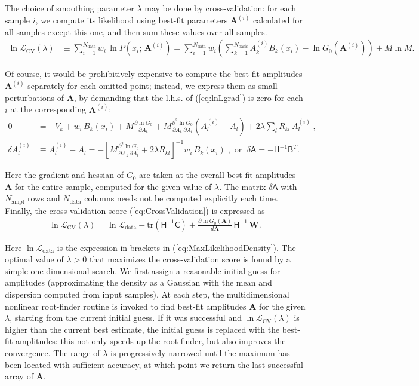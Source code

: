\documentclass[12pt]{article}
\renewcommand{\d}{\partial}
\newcommand{\bA}{\boldsymbol{A}}
\begin{document}
The choice of smoothing parameter $\lambda$ may be done by cross-validation: for each sample $i$, we compute its likelihood using best-fit parameters $\bA^{(i)}$ calculated for all samples except this one, and then sum these values over all samples. 
\begin{align}  \label{eq:CrossValidation}
\ln\mathcal{L}_\mathrm{CV}(\lambda) &\equiv \sum_{i=1}^{N_\mathrm{data}} w_i \, \ln P(x_i;\, \bA^{(i)}) =
\sum_{i=1}^{N_\mathrm{data}} w_i \left(\sum_{k=1}^{N_\mathrm{basis}} A_k^{(i)} B_k(x_i) - \ln G_0(\bA^{(i)}) \right) + M\ln M.
\end{align}

Of course, it would be prohibitively expensive to compute the best-fit amplitudes $\bA^{(i)}$ separately for each omitted point; instead, we express them as small perturbations of $\bA$, by demanding that the l.h.s. of (\ref{eq:lnLgrad}) is zero for each $i$ at the corresponding $\bA^{(i)}$:
\begin{align*}
0 &= -V_k + w_i\,B_k(x_i) + M \frac{\d \ln G_0}{\d A_k} + M \frac{\d^2 \ln G_0}{\d A_k\,\d A_l}(A_l^{(i)}-A_l) + 2\lambda \sum_l R_{kl}\,A_l^{(i)} \;, \\
\delta A^{(i)}_l &\equiv A^{(i)}_l - A_l = - \left[ M \frac{\d^2 \ln G_0}{\d A_k\,\d A_l} + 2\lambda R_{kl} \right]^{-1} w_i\,B_k(x_i) \;,\mbox{ or }\;
\delta \mathsf{A} = -\mathsf{H}^{-1} \mathsf{B}^T .
\end{align*}

Here the gradient and hessian of $G_0$ are taken at the overall best-fit amplitudes $\bA$ for the entire sample, computed for the given value of $\lambda$. The matrix $\delta \mathsf{A}$ with $N_\mathrm{ampl}$ rows and $N_\mathrm{data}$ columns needs not be computed explicitly each time. Finally, the cross-validation score (\ref{eq:CrossValidation}) is expressed as
\begin{align}  \label{eq:CrossValidation2}
\ln\mathcal{L}_\mathrm{CV}(\lambda) = \ln\mathcal{L}_\mathrm{data}
- \mathrm{tr}(\mathsf{H}^{-1}\mathsf{C}) + \frac{\d\ln G_0(\bA)}{d\bA}\, \mathsf{H}^{-1}\, \boldsymbol{W} .
\end{align}

Here $\ln\mathcal{L}_\mathrm{data}$ is the expression in brackets in (\ref{eq:MaxLikelihoodDensity}). The optimal value of $\lambda>0$ that maximizes the cross-validation score is found by a simple one-dimensional search. We first assign a reasonable initial guess for amplitudes (approximating the density as a Gaussian with the mean and dispersion computed from input samples). At each step, the multidimensional nonlinear root-finder routine is invoked to find best-fit amplitudes $\bA$ for the given $\lambda$, starting from the current initial guess. If it was successful and $\ln\mathcal{L}_\mathrm{CV}(\lambda)$ is higher than the current best estimate, the initial guess is replaced with the best-fit amplitudes: this not only speeds up the root-finder, but also improves the convergence. The range of $\lambda$ is progressively narrowed until the maximum has been located with sufficient accuracy, at which point we return the last successful array of $\bA$. 
\end{document}
